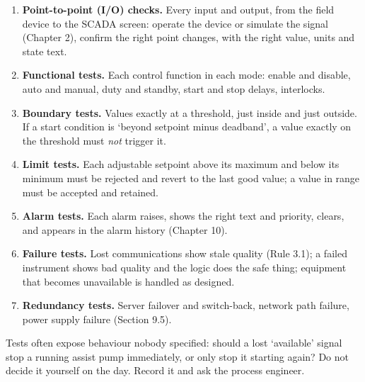 \begin{enumerate}
\item \textbf{Point-to-point (I/O) checks.} Every input and output, from the field device to the SCADA screen: operate the device or simulate the signal (Chapter 2), confirm the right point changes, with the right value, units and state text.
\item \textbf{Functional tests.} Each control function in each mode: enable and disable, auto and manual, duty and standby, start and stop delays, interlocks.
\item \textbf{Boundary tests.} Values exactly at a threshold, just inside and just outside. If a start condition is ‘beyond setpoint minus deadband’, a value exactly on the threshold must \emph{not} trigger it.
\item \textbf{Limit tests.} Each adjustable setpoint above its maximum and below its minimum must be rejected and revert to the last good value; a value in range must be accepted and retained.
\item \textbf{Alarm tests.} Each alarm raises, shows the right text and priority, clears, and appears in the alarm history (Chapter 10).
\item \textbf{Failure tests.} Lost communications show stale quality (Rule 3.1); a failed instrument shows bad quality and the logic does the safe thing; equipment that becomes unavailable is handled as designed.
\item \textbf{Redundancy tests.} Server failover and switch-back, network path failure, power supply failure (Section 9.5).
\end{enumerate}
 Tests often expose behaviour nobody specified: should a lost ‘available’ signal stop a running assist pump immediately, or only stop it starting again? Do not decide it yourself on the day. Record it and ask the process engineer.

